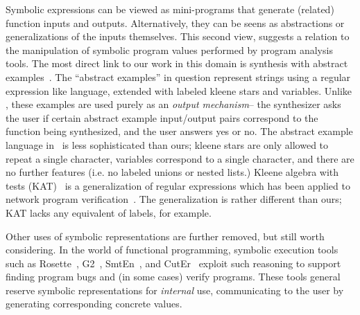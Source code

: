 Symbolic expressions can be viewed as mini-programs
that generate (related) function inputs and outputs.
Alternatively, they can be seens as abstractions or generalizations
of the inputs themselves.
This second view,
suggests a relation to the manipulation of symbolic program values performed
by program analysis tools.
The most direct link to our work
in this domain is synthesis with abstract examples~\cite{drachsler2017synthesis}.
The ``abstract examples'' in question
represent
strings using a regular expression like language,
extended with labeled kleene stars
and variables.
Unlike \ourDSL, these examples are used purely as an \textit{output mechanism}--
the synthesizer asks the user if certain abstract example input/output pairs
correspond to the function being synthesized, and the user answers yes or no.
The abstract example language in~\cite{drachsler2017synthesis}
is less sophisticated than ours;
kleene stars are only allowed to repeat a single character,
variables correspond to a single character,
and there are no further features
(i.e. no labeled unions or nested lists.)
Kleene algebra with tests (KAT)~\cite{kozen1997kleene}
is a generalization of regular expressions
which has been applied to network program verification~\cite{anderson2014netkat}.
The generalization is rather different than ours;
KAT lacks any equivalent of labels, for example.

Other uses of symbolic representations are further removed,
but still worth considering.
In the world of functional programming,
symbolic execution tools such as
Rosette~\cite{torlak2014lightweight}, G2~\cite{hallahan2019lazy}, SmtEn~\cite{uhler2014smten}, and CutEr~\cite{giantsios2015concolic}
exploit such reasoning to support finding program bugs and (in some cases) verify programs.
These tools general reserve symbolic representations for \textit{internal} use,
communicating to the user by generating corresponding concrete values.
